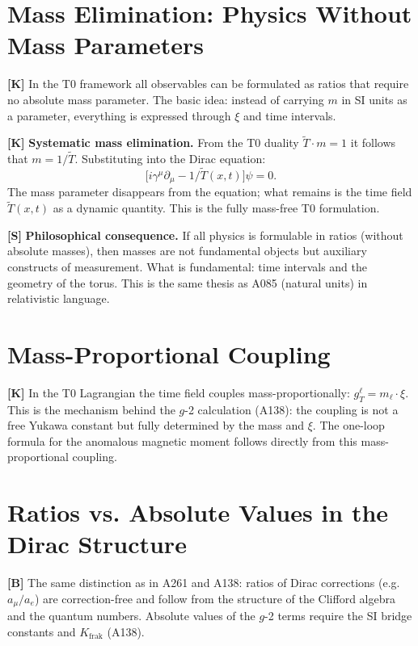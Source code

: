 \section{Mass Elimination: Physics Without Mass Parameters}

\textbf{[K]} In the T0 framework all observables can be formulated as ratios that
require no absolute mass parameter. The basic idea: instead of carrying $m$ in SI
units as a parameter, everything is expressed through $\xi$ and time intervals.

\textbf{[K]} \textbf{Systematic mass elimination.} From the T0 duality
$\tilde T\cdot m=1$ it follows that $m=1/\tilde T$. Substituting into the Dirac
equation:
\[
  \bigl[i\gamma^\mu\partial_\mu - 1/\tilde T(x,t)\bigr]\psi = 0.
\]
The mass parameter disappears from the equation; what remains is the time field
$\tilde T(x,t)$ as a dynamic quantity. This is the fully mass-free T0 formulation.

\textbf{[S]} \textbf{Philosophical consequence.} If all physics is formulable in
ratios (without absolute masses), then masses are not fundamental objects but
auxiliary constructs of measurement. What is fundamental: time intervals and the
geometry of the torus. This is the same thesis as A085 (natural units) in
relativistic language.

\section{Mass-Proportional Coupling}

\textbf{[K]} In the T0 Lagrangian the time field couples mass-proportionally:
$g_T^\ell = m_\ell\cdot\xi$. This is the mechanism behind the $g$-2 calculation
(A138): the coupling is not a free Yukawa constant but fully determined by the
mass and $\xi$. The one-loop formula for the anomalous magnetic moment follows
directly from this mass-proportional coupling.

\section{Ratios vs. Absolute Values in the Dirac Structure}

\textbf{[B]} The same distinction as in A261 and A138: ratios of Dirac corrections
(e.g.\ $a_\mu/a_e$) are correction-free and follow from the structure of the
Clifford algebra and the quantum numbers. Absolute values of the $g$-2 terms
require the SI bridge constants and $K_\text{frak}$ (A138).

